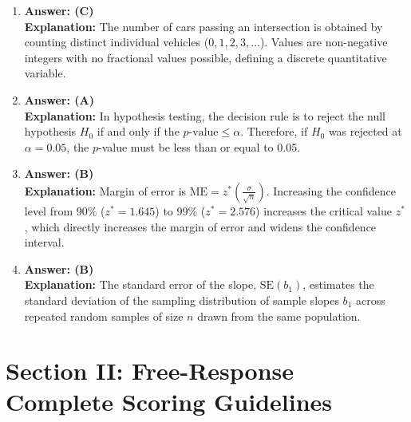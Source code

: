 \begin{enumerate}[leftmargin=1.5em]
  \item \textbf{Answer: (C)} \\
  \textbf{Explanation:} The number of cars passing an intersection is obtained by counting distinct individual vehicles ($0, 1, 2, 3, \dots$). Values are non-negative integers with no fractional values possible, defining a discrete quantitative variable.

  \item \textbf{Answer: (A)} \\
  \textbf{Explanation:} In hypothesis testing, the decision rule is to reject the null hypothesis $H_0$ if and only if the $p\text{-value} \le \alpha$. Therefore, if $H_0$ was rejected at $\alpha = 0.05$, the $p$-value must be less than or equal to 0.05.

  \item \textbf{Answer: (B)} \\
  \textbf{Explanation:} Margin of error is $\text{ME} = z^* \left(\frac{\sigma}{\sqrt{n}}\right)$. Increasing the confidence level from 90\% ($z^* = 1.645$) to 99\% ($z^* = 2.576$) increases the critical value $z^*$, which directly increases the margin of error and widens the confidence interval.

  \item \textbf{Answer: (B)} \\
  \textbf{Explanation:} The standard error of the slope, $\text{SE}(b_1)$, estimates the standard deviation of the sampling distribution of sample slopes $b_1$ across repeated random samples of size $n$ drawn from the same population.
\end{enumerate}

\section{Section II: Free-Response Complete Scoring Guidelines}

